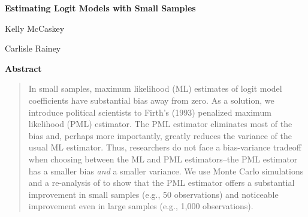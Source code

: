 \documentclass[12pt]{article}
\begin{document}
\begin{center}
{\LARGE{\textbf{Estimating Logit Models with Small Samples}}}\\\vspace{2mm}

\vspace{10mm}

Kelly McCaskey

\vspace{3mm}

Carlisle Rainey
\end{center}

\vspace{10mm}

{\centerline{\textbf{Abstract}}}
\begin{quote}\noindent
In small samples, maximum likelihood (ML) estimates of logit model coefficients have substantial bias away from zero.
As a solution, we introduce political scientists to Firth's (1993) penalized maximum likelihood (PML) estimator.
The PML estimator eliminates most of the bias and, perhaps more importantly, greatly reduces the variance of the usual ML estimator.
Thus, researchers do not face a bias-variance tradeoff when choosing between the ML and PML estimators--the PML estimator has a smaller bias \textit{and} a smaller variance.
We use Monte Carlo simulations and a re-analysis of \cite{GeorgeEpstein1992} to show that the PML estimator offers a substantial improvement in small samples (e.g., 50 observations) and noticeable improvement even in large samples (e.g., 1,000 observations).
 \end{quote}
\end{document}
